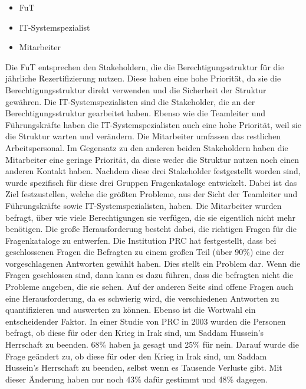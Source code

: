 \begin{itemize}
	\item \ac{FuT}
	\item IT-Systemspezialist
	\item Mitarbeiter
\end{itemize}
Die \ac{FuT} entsprechen den Stakeholdern, die die Berechtigungsstruktur für die jährliche Rezertifizierung nutzen.
Diese haben eine hohe Priorität, da sie die Berechtigungsstruktur direkt verwenden und die Sicherheit der Struktur gewähren.
\newline
Die IT-Systemspezialisten sind die Stakeholder, die an der Berechtigungsstruktur gearbeitet haben.
Ebenso wie die Teamleiter und Führungskräfte haben die IT-Systemspezialisten auch eine hohe Priorität, weil sie die Struktur warten und verändern.
\newline
Die Mitarbeiter umfassen das restlichen Arbeitspersonal.
Im Gegensatz zu den anderen beiden Stakeholdern haben die Mitarbeiter eine geringe Priorität, da diese weder die Struktur nutzen noch einen anderen Kontakt haben.
\newline
\newline
Nachdem diese drei Stakeholder festgestellt worden sind, wurde spezifisch für diese drei Gruppen Fragenkataloge entwickelt.
Dabei ist das Ziel festzustellen, welche die größten Probleme, aus der Sicht der Teamleiter und Führungskräfte sowie IT-Systemspezialisten, haben.
Die Mitarbeiter wurden befragt, über wie viele Berechtigungen sie verfügen, die sie eigentlich nicht mehr benötigen.
Die große Herausforderung besteht dabei, die richtigen Fragen für die Fragenkataloge zu entwerfen.
Die Institution \ac{PRC} hat festgestellt, dass bei geschlossenen Fragen die Befragten zu einem großen Teil (über 90\%) eine der vorgeschlagenen Antworten gewählt haben. \cite{Survey}
Dies stellt ein Problem dar.
Wenn die Fragen geschlossen sind, dann kann es dazu führen, dass die befragten nicht die Probleme angeben, die sie sehen.
Auf der anderen Seite sind offene Fragen auch eine Herausforderung, da es schwierig wird, die verschiedenen Antworten zu quantifizieren und auswerten zu können.
Ebenso ist die Wortwahl ein entscheidender Faktor.
In einer Studie von \ac{PRC} in 2003 wurden die Personen befragt, ob diese für oder den Krieg in Irak sind, um Saddam Hussein's Herrschaft zu beenden.
68\% haben ja gesagt und 25\% für nein.
Darauf wurde die Frage geändert zu, ob diese für oder den Krieg in Irak sind, um Saddam Hussein's Herrschaft zu beenden, selbst wenn es Tausende Verluste gibt.
Mit dieser Änderung haben nur noch 43\% dafür gestimmt und 48\% dagegen. \cite{Survey}
